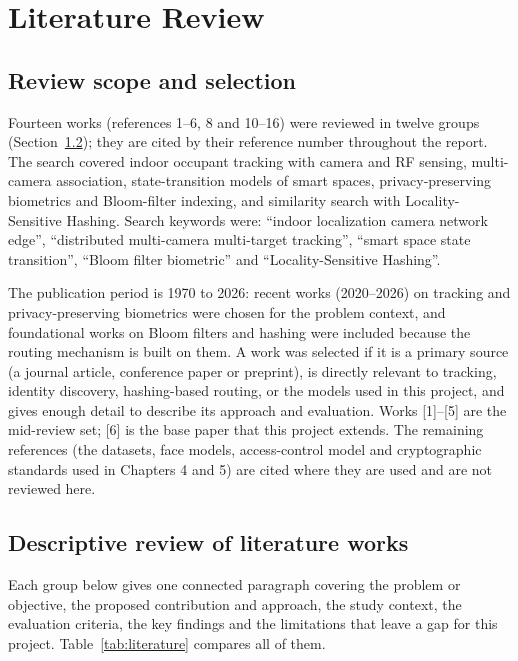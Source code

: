 \documentclass[12pt,a4paper,oneside]{report}
\begin{document}
\clearpage
\chapter{Literature Review}
\section{Review scope and selection}
Fourteen works (references 1--6, 8 and 10--16) were reviewed in twelve groups (Section~\ref{sec:lit-desc}); they are cited by their reference number throughout the report. The search covered indoor occupant tracking with camera and RF sensing, multi-camera association, state-transition models of smart spaces, privacy-preserving biometrics and Bloom-filter indexing, and similarity search with Locality-Sensitive Hashing. Search keywords were: ``indoor localization camera network edge'', ``distributed multi-camera multi-target tracking'', ``smart space state transition'', ``Bloom filter biometric'' and ``Locality-Sensitive Hashing''.

The publication period is 1970 to 2026: recent works (2020--2026) on tracking and privacy-preserving biometrics were chosen for the problem context, and foundational works on Bloom filters and hashing were included because the routing mechanism is built on them. A work was selected if it is a primary source (a journal article, conference paper or preprint), is directly relevant to tracking, identity discovery, hashing-based routing, or the models used in this project, and gives enough detail to describe its approach and evaluation. Works [1]--[5] are the mid-review set; [6] is the base paper that this project extends. The remaining references (the datasets, face models, access-control model and cryptographic standards used in Chapters 4 and 5) are cited where they are used and are not reviewed here.

\section{Descriptive review of literature works}\label{sec:lit-desc}
Each group below gives one connected paragraph covering the problem or objective, the proposed contribution and approach, the study context, the evaluation criteria, the key findings and the limitations that leave a gap for this project. Table~\ref{tab:literature} compares all of them.
\end{document}
